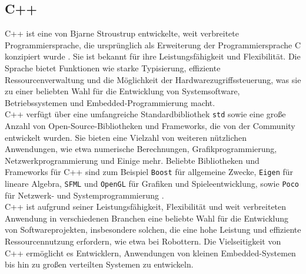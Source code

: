 \subsection{C++}\label{subsec:Cpp}
C++ ist eine von Bjarne Stroustrup entwickelte, weit verbreitete Programmiersprache, die ursprünglich als Erweiterung der Programmiersprache C konzipiert wurde \cite{CppWikipedia}. Sie ist bekannt für ihre Leistungsfähigkeit und Flexibilität. Die Sprache bietet Funktionen wie starke Typisierung, effiziente Ressourcenverwaltung und die Möglichkeit der Hardwarezugriffssteuerung, was sie zu einer beliebten Wahl für die Entwicklung von Systemsoftware, Betriebssystemen und Embedded-Programmierung macht.\\
C++ verfügt über eine umfangreiche Standardbibliothek \texttt{std} sowie eine große Anzahl von Open-Source-Bibliotheken und Frameworks, die von der Community entwickelt wurden. Sie bieten eine Vielzahl von weiteren nützlichen Anwendungen, wie etwa numerische Berechnungen, Grafikprogrammierung, Netzwerkprogrammierung und Einige mehr. Beliebte Bibliotheken und Frameworks für C++ sind zum Beispiel \texttt{Boost} für allgemeine Zwecke, \texttt{Eigen} für lineare Algebra, \texttt{\ac{SFML}} und \texttt{OpenGL} für Grafiken und Spieleentwicklung, sowie \texttt{Poco} für Netzwerk- und Systemprogrammierung \cite{CppBibliotheken}.\\
C++ ist aufgrund seiner Leistungsfähigkeit, Flexibilität und weit verbreiteten Anwendung in verschiedenen Branchen eine beliebte Wahl für die Entwicklung von Softwareprojekten, insbesondere solchen, die eine hohe Leistung und effiziente Ressourcennutzung erfordern, wie etwa bei Robottern. Die Vielseitigkeit von C++ ermöglicht es Entwicklern, Anwendungen von kleinen Embedded-Systemen bis hin zu großen verteilten Systemen zu entwickeln.\\

